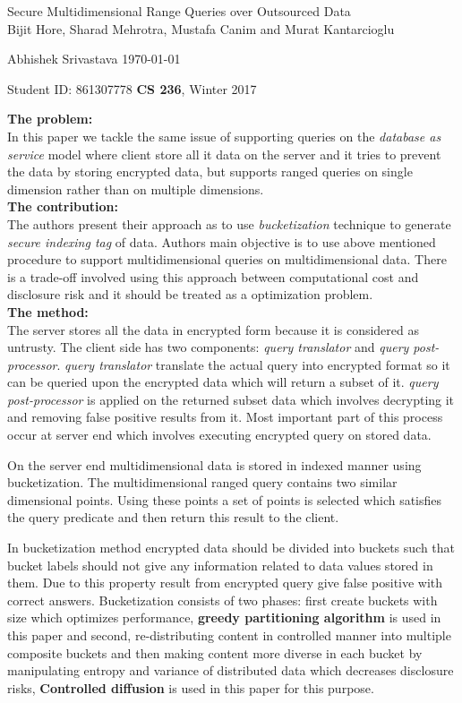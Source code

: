 \documentclass[a4paper,12pt, twoside]{article}
\renewcommand{\maketitle}{%
 	\Large
 	\begin{center}
 	Secure Multidimensional Range Queries over Outsourced Data\\	
 	\normalsize Bijit Hore, Sharad Mehrotra, Mustafa Canim and Murat Kantarcioglu
 	\end{center}
 
 	\Large
	Abhishek Srivastava
	\hfill
	\normalsize
	\today
 	\par
 	Student ID: 861307778
 	\hfill
 	\textbf{CS 236}, Winter 2017
 	\par 	
 	\hrulefill
 	\par
 	}
\begin{document}
\thispagestyle{empty}
	
\maketitle
\textbf{The problem:}\\
In this paper we tackle the same issue of supporting queries on the \emph{database as service} model where client store all it data on the server and it tries to prevent the data by storing encrypted data, but supports ranged queries on single dimension rather than on multiple dimensions.\\   

\textbf{The contribution:}\\
The authors present their approach as to use \emph{bucketization} technique to generate \emph{secure indexing tag} of data. Authors main objective is to use above mentioned procedure to support multidimensional queries on multidimensional data. There is a trade-off involved using this approach between computational cost and disclosure risk and it should be treated as a optimization problem.\\
 
\textbf{The method:}\\
The server stores all the data in encrypted form because it is considered as untrusty. The client side has two components: \emph{query translator} and \emph{query post-processor}. \emph{query translator} translate the actual query into encrypted format so it can be queried upon the encrypted data which will return a subset of it. \emph{query post-processor} is applied on the returned subset data which involves decrypting it and removing false positive results from it. Most important part of this process occur at server end which involves executing encrypted query on stored data.

On the server end multidimensional data is stored in indexed manner using bucketization. The multidimensional ranged query contains two similar dimensional points. Using these points a set of points is selected which satisfies the query predicate and then return this result to the client.

In bucketization method encrypted data should be divided into buckets such that bucket labels should not give any information related to data values stored in them. Due to this property result from encrypted query give false positive with correct answers. Bucketization consists of two phases: first create buckets with size which optimizes performance, \textbf{greedy partitioning algorithm} is used in this paper and second, re-distributing content in controlled manner into multiple composite buckets and then making content more diverse in each bucket by manipulating entropy and variance of distributed data which decreases disclosure risks, \textbf{Controlled diffusion} is used in this paper for this purpose.\\
\end{document}
